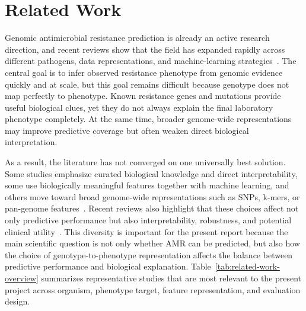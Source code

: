 \section{Related Work}

Genomic antimicrobial resistance prediction is already an active research direction, and recent reviews show that the field has expanded rapidly across different pathogens, data representations, and machine-learning strategies~\citep{kim2022ml,tang2022systematic,ardila2024wgsml}. The central goal is to infer observed resistance phenotype from genomic evidence quickly and at scale, but this goal remains difficult because genotype does not map perfectly to phenotype. Known resistance genes and mutations provide useful biological clues, yet they do not always explain the final laboratory phenotype completely. At the same time, broader genome-wide representations may improve predictive coverage but often weaken direct biological interpretation.

As a result, the literature has not converged on one universally best solution. Some studies emphasize curated biological knowledge and direct interpretability, some use biologically meaningful features together with machine learning, and others move toward broad genome-wide representations such as SNPs, k-mers, or pan-genome features~\citep{feldgarden2021amrfinderplus,maguire2019identification,ren2022prediction}. Recent reviews also highlight that these choices affect not only predictive performance but also interpretability, robustness, and potential clinical utility~\citep{kim2022ml,tang2022systematic,ardila2024wgsml}. This diversity is important for the present report because the main scientific question is not only whether AMR can be predicted, but also how the choice of genotype-to-phenotype representation affects the balance between predictive performance and biological explanation. Table~\ref{tab:related-work-overview} summarizes representative studies that are most relevant to the present project across organism, phenotype target, feature representation, and evaluation design.

